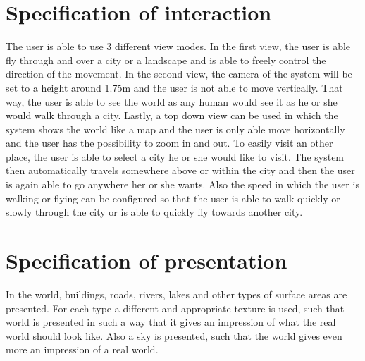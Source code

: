 \section{Specification of interaction}
\label{sec:SpecificationOfInteraction}
The user is able to use 3 different view modes. In the first view, the user is able fly through and over a city or a landscape and is able to freely control the direction of the movement. In the second view, the camera of the system will be set to a height around 1.75m and the user is not able to move vertically. That way, the user is able to see the world as any human would see it as he or she would walk through a city. Lastly, a top down view can be used in which the system shows the world like a map and the user is only able move horizontally and the user has the possibility to zoom in and out. To easily visit an other place, the user is able to select a city he or she would like to visit. The system then automatically travels somewhere above or within the city and then the user is again able to go anywhere her or she wants. Also the speed in which the user is walking or flying can be configured so that the user is able to walk quickly or slowly through the city or is able to quickly fly towards another city.

\section{Specification of presentation}
\label{sec:SpecificationOfPresentation}
In the world, buildings, roads, rivers, lakes and other types of surface areas are presented. For each type a different and appropriate texture is used, such that world is presented in such a way that it gives an impression of what the real world should look like. Also a sky is presented, such that the world gives even more an impression of a real world. 